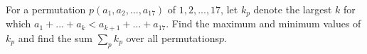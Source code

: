 For a permutation $p(a_1,a_2,...,a_{17})$ of $1,2,...,17$, let $k_p$ denote the largest $k$ for which $a_1 +...+a_k < a_{k+1} +...+a_{17}$. Find the maximum and minimum values of $k_p$ and find the sum $\sum_{p} k_p$ over all permutations$ p$.